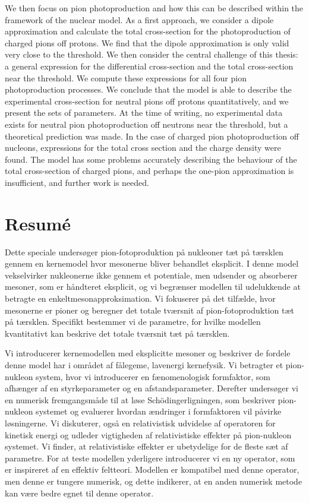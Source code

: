 We then focus on pion photoproduction and how this can be described within the framework of the nuclear model. As a first approach, we consider a dipole approximation and calculate the total cross-section for the photoproduction of charged pions off protons. We find that the dipole approximation is only valid very close to the threshold. We then consider the central challenge of this thesis: a general expression for the differential cross-section and the total cross-section near the threshold. We compute these expressions for all four pion photoproduction processes. We conclude that the model is able to describe the experimental cross-section for neutral pions off protons quantitatively, and we present the sets of parameters. At the time of writing, no experimental data exists for neutral pion photoproduction off neutrons near the threshold, but a theoretical prediction was made. In the case of charged pion photoproduction off nucleons, expressions for the total cross section and the charge density were found. The model has some problems accurately describing the behaviour of the total cross-section of charged pions, and perhaps the one-pion approximation is insufficient, and further work is needed.

\newpage
\section*{Resumé}
Dette speciale undersøger pion-fotoproduktion på nukleoner tæt på tærsklen gennem en kernemodel hvor mesonerne bliver behandlet eksplicit. I denne model vekselvirker nukleonerne ikke gennem et potentiale, men udsender og absorberer mesoner, som er håndteret eksplicit, og vi begrænser modellen til udelukkende at betragte en enkeltmesonapproksimation. Vi fokuserer på det tilfælde, hvor mesonerne er pioner og beregner det totale tværsnit af pion-fotoproduktion tæt på tærsklen. Specifikt bestemmer vi de parametre, for hvilke modellen kvantitativt kan beskrive det totale tværsnit tæt på tærsklen. 

Vi introducerer kernemodellen med eksplicitte mesoner og beskriver de fordele denne model har i området af fålegeme, lavenergi kernefysik. Vi betragter et pion-nukleon system, hvor vi introducerer en  fænomenologisk formfaktor, som afhænger af en styrkeparameter og en afstandsparameter. Derefter undersøger vi en numerisk fremgangsmåde til at løse Schödingerligningen, som beskriver pion-nukleon systemet og evaluerer hvordan  ændringer i formfaktoren vil påvirke løsningerne. Vi diskuterer, også en relativistisk udvidelse af operatoren for kinetisk energi og udleder vigtigheden af relativistiske effekter på pion-nukleon systemet. Vi finder, at relativistiske effekter er ubetydelige for de fleste sæt af parametre. For at teste modellen yderligere introducerer vi en ny operator, som er inspireret af en effektiv feltteori. Modellen er kompatibel med denne operator, men denne er tungere numerisk, og dette indikerer, at en anden numerisk metode kan være bedre egnet til denne operator.


